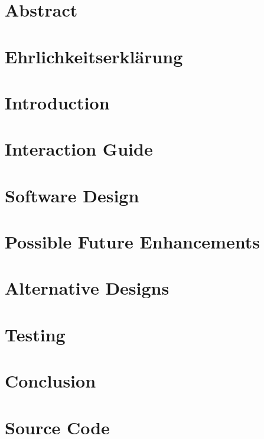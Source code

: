 \documentclass[12pt]{report}
\begin{document}
\begin{titlepage}   

\end{titlepage}


\chapter*{Abstract}



\chapter*{Ehrlichkeitserklärung}


\tableofcontents

\newpage

\chapter{Introduction}


\chapter{Interaction Guide}


\chapter{Software Design}


\chapter{Possible Future Enhancements}


\chapter{Alternative Designs}


\chapter{Testing}


\chapter{Conclusion}


\appendix
\printglossaries

\chapter{Source Code}



\end{document}
